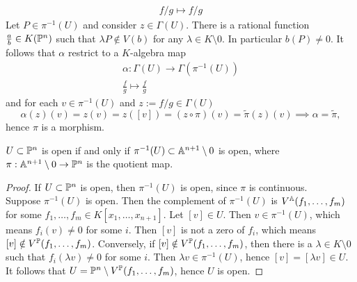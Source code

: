 \begin{example}
\begin{enumerate}
\begin{gather*}
                f/g\mapsto f/g
            \end{gather*}
            Let $P\in \pi^{-1}(U)$ and consider $z\in \Gamma(U)$. There is a rational function $\frac{a}{b}\in K(\mathbb{P}^n)$ such that $\lambda P\notin V(b)$ for any $\lambda\in K\setminus 0$. In particular $b(P)\neq 0$. It follows that $\alpha$ restrict to a $K$-algebra map
            \begin{gather*}
                \alpha : \Gamma(U)\rightarrow \Gamma\left( \pi^{-1}(U)\right)\\
                \frac{f}{g}\mapsto \frac{f}{g}
            \end{gather*}
            and for each $v\in \pi^{-1}(U)$ and $z:=f/g\in \Gamma(U)$
            $$\alpha(z)(v)=z(v)=z([v])=(z\circ \pi)(v)=\widetilde{\pi}(z)(v)\implies \alpha = \widetilde{\pi},$$
            hence $\pi$ is a morphism. 
        \end{enumerate}
    \end{example}
    \begin{lemma}
        $U\subset \mathbb{P}^n$ is open if and only if $\pi^{-1}(U)\subset \mathbb{A}^{n+1}\setminus 0$ is open, where $\pi: \mathbb{A}^{n+1}\setminus 0\rightarrow \mathbb{P}^n$ is the quotient map. 
    \end{lemma}
    \begin{proof}
        If $U\subset \mathbb{P}^n$ is open, then $\pi^{-1}(U)$ is open, since $\pi$ is continuous.\\
        Suppose $\pi^{-1}(U)$ is open. Then the complement of $\pi^{-1}(U)$ is $V^{\mathbb{A}}(f_1,\dots,f_m)$ for some $f_1,\dots,f_m\in K[x_1,\dots,x_{n+1}]$. Let $[v]\in U$. Then $v\in \pi^{-1}(U)$, which means $f_i(v)\neq 0$ for some $i$. Then $[v]$ is not a zero of $f_i$, which means $[v]\notin V^{\mathbb{P}}(f_1,\dots,f_m)$. Conversely, if $[v]\notin V^{\mathbb{P}}(f_1,\dots,f_m)$, then there is a $\lambda \in K\setminus 0$ such that $f_i(\lambda v)\neq 0$ for some $i$. Then $\lambda v\in \pi^{-1}(U)$, hence $[v]=[\lambda v]\in U$. It follows that $U = \mathbb{P}^n\setminus V^{\mathbb{P}}(f_1,\dots,f_m)$, hence $U$ is open.  
    \end{proof}
